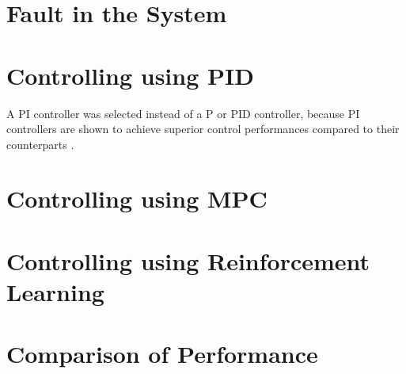 \section{Fault in the System}

\section{Controlling using PID}
A PI controller was selected instead of a P or PID controller, because PI controllers are shown to achieve superior control performances compared to their counterparts \cite{PI_controller}.

\section{Controlling using MPC}
\section{Controlling using Reinforcement Learning}
\section{Comparison of Performance}